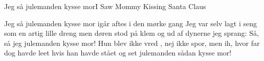 \begin{sang}{Jeg så julemanden kysse mor}{I Saw Mommy Kissing Santa Claus}

\begin{vers}
Jeg så julemanden kysse mor
igår aftes i den mørke gang
Jeg var selv lagt i seng
som en artig lille dreng
men døren stod på klem
og ud af dynerne jeg sprang:
Så, så jeg julemanden kysse mor!
Hun blev ikke vred , nej ikke spor,
men ih, hvor far dog havde leet
hvis han havde stået og set
julemanden sådan kysse mor!
\end{vers}


\end{sang}
